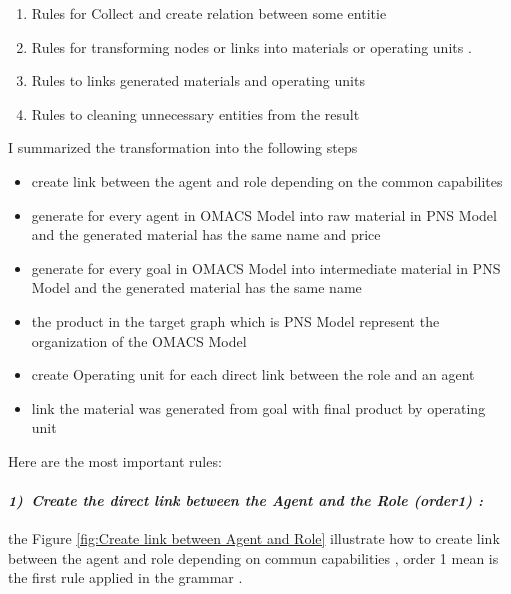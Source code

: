 \begin{enumerate}
\item Rules for Collect and create relation between some entitie
\item Rules for transforming nodes or links into materials or operating units .
\item Rules to links generated materials and operating units
\item Rules to cleaning unnecessary entities from the result 

\end{enumerate}
I summarized the transformation into the following steps  

\begin{itemize}

\item create link between the agent and role depending on the common capabilites

\item generate for every agent in OMACS Model into raw material in PNS Model
and the generated material has the same name and price 

\item generate for every goal in OMACS Model into intermediate material in PNS Model and the generated material has the same name  


\item the product in the target graph which is PNS Model represent the organization of the OMACS Model

\item create Operating unit for each direct link between the role and an agent 

\item link the material was generated from goal with final product by operating unit

\end{itemize}

  
\pagebreak

Here are the most important rules:  

\paragraph{\emph{1)~Create the direct link  between the Agent and the Role (order1) :} } 

the Figure \ref{fig:Create link between Agent and Role} illustrate how to create link between the agent and role depending on commun capabilities , order 1 mean is the first rule applied in the grammar . 


